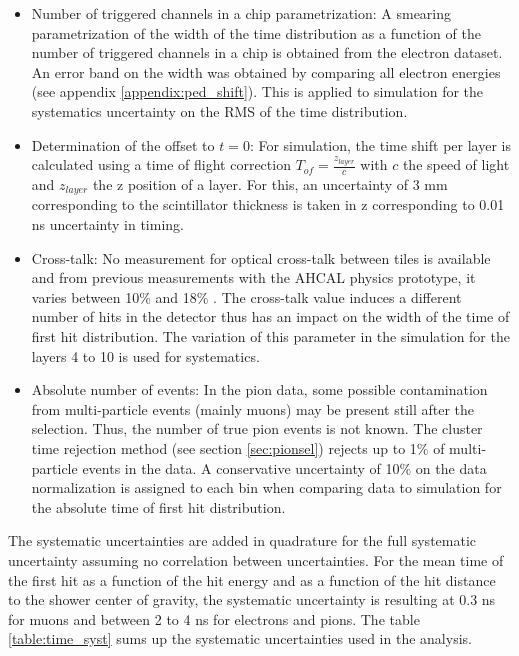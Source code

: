 \begin{itemize}
	\item Number of triggered channels in a chip parametrization: A smearing parametrization of the width of the time distribution as a function of the number of triggered channels in a chip is obtained from the electron dataset. An error band on the width was obtained by comparing all electron energies (see appendix \ref{appendix:ped_shift}). This is applied to simulation for the systematics uncertainty on the RMS of the time distribution.
	\item Determination of the offset to $t=0$: For simulation, the time shift per layer is calculated using a time of flight correction $T_{of} = \frac{z_{layer}}{c}$ with $c$ the speed of light and $z_{layer}$ the z position of a layer. For this, an uncertainty of 3 mm corresponding to the scintillator thickness is taken in z corresponding to 0.01 ns uncertainty in timing.
	\item Cross-talk: No measurement for optical cross-talk between tiles is available and from previous measurements with the AHCAL physics prototype, it varies between 10\% and 18\% \cite{Gunter:2015ika}. The cross-talk value induces a different number of hits in the detector thus has an impact on the width of the time of first hit distribution. The variation of this parameter in the simulation for the layers 4 to 10 is used for systematics.
	\item Absolute number of events: In the pion data, some possible contamination from multi-particle events (mainly muons) may be present still after the selection. Thus, the number of true pion events is not known. The cluster time rejection method (see section \ref{sec:pionsel}) rejects up to 1\% of multi-particle events in the data. A conservative uncertainty of 10\% on the data normalization is assigned to each bin when comparing data to simulation for the absolute time of first hit distribution.
\end{itemize}

The systematic uncertainties are added in quadrature for the full systematic uncertainty assuming no correlation between uncertainties. For the mean time of the first hit as a function of the hit energy and as a function of the hit distance to the shower center of gravity, the systematic uncertainty is resulting at 0.3 ns for muons and between 2 to 4 ns for electrons and pions. The table \ref{table:time_syst} sums up the systematic uncertainties used in the analysis.

